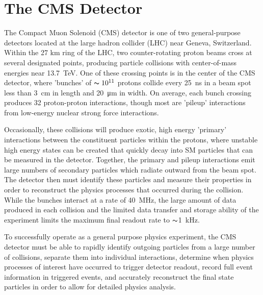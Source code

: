 \chapter{The CMS Detector}
\label{sec:detector}

The Compact Muon Solenoid (CMS) detector is one of two general-purpose detectors located at the large hadron collider (LHC) near Geneva, Switzerland. 
Within the 27 km ring of the LHC, two counter-rotating proton beams cross at several designated points, producing particle collisions with center-of-mass energies near \SI{13.7}{\tera\eV}. 
One of these crossing points is in the center of the CMS detector, where 'bunches' of $\thicksim10^{11}$ protons collide every \SI{25}{\nano\second} in a beam spot less than \SI{3}{\centi\meter} in length and \SI{20}{\micro\meter} in width. 
On average, each bunch crossing produces 32 proton-proton interactions, though most are 'pileup' interactions from low-energy nuclear strong force interactions.

Occasionally, these collisions will produce exotic, high energy 'primary' interactions between the constituent particles within the protons, where unstable high energy states can be created that quickly decay into SM particles that can be measured in the detector.
Together, the primary and pileup interactions emit large numbers of secondary particles which radiate outward from the beam spot. 
The detector then must identify these particles and measure their properties in order to reconstruct the physics processes that occurred during the collision. 
While the bunches interact at a rate of \SI{40}{\mega\hertz}, the large amount of data produced in each collision and the limited data transfer and storage ability of the experiment limits the maximum final readout rate to $\thicksim$\SI{1}{\kilo\hertz}.

To successfully operate as a general purpose physics experiment, the CMS detector must be able to rapidly identify outgoing particles from a large number of collisions, separate them into individual interactions, determine when physics processes of interest have occurred to trigger detector readout, record full event information in triggered events, and accurately reconstruct the final state particles in order to allow for detailed physics analysis. 

